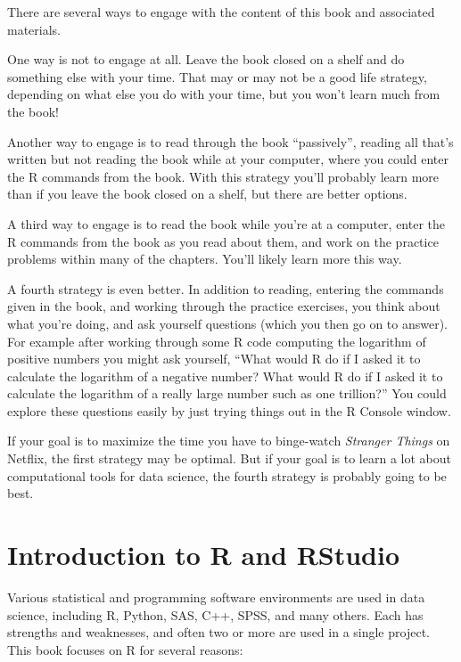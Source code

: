 \documentclass[
]{krantz}
\begin{document}
There are several ways to engage with the content of this book and associated materials.

One way is not to engage at all. Leave the book closed on a shelf and do something else with your time. That may or may not be a good life strategy, depending on what else you do with your time, but you won't learn much from the book!

Another way to engage is to read through the book ``passively'', reading all that's written but not reading the book while at your computer, where you could enter the R commands from the book. With this strategy you'll probably learn more than if you leave the book closed on a shelf, but there are better options.

A third way to engage is to read the book while you're at a computer, enter the R commands from the book as you read about them, and work on the practice problems within many of the chapters. You'll likely learn more this way.

A fourth strategy is even better. In addition to reading, entering the commands given in the book, and working through the practice exercises, you think about what you're doing, and ask yourself questions (which you then go on to answer). For example after working through some R code computing the logarithm of positive numbers you might ask yourself, ``What would R do if I asked it to calculate the logarithm of a negative number? What would R do if I asked it to calculate the logarithm of a really large number such as one trillion?'' You could explore these questions easily by just trying things out in the R Console window.

If your goal is to maximize the time you have to binge-watch \emph{Stranger Things} on Netflix, the first strategy may be optimal. But if your goal is to learn a lot about computational tools for data science, the fourth strategy is probably going to be best.

\hypertarget{introduction-to-r-and-rstudio}{%
\chapter{Introduction to R and RStudio}\label{introduction-to-r-and-rstudio}}

Various statistical and programming software environments are used in data science, including R, Python, SAS, C++, SPSS, and many others. Each has strengths and weaknesses, and often two or more are used in a single project. This book focuses on R for several reasons:
\end{document}
